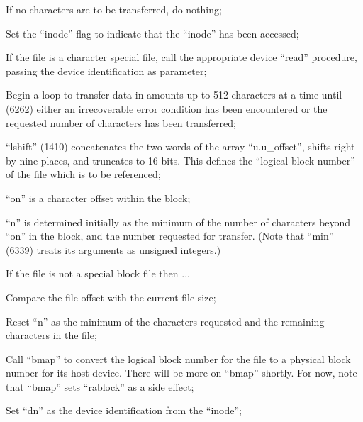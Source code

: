 
\bd
\item[6230:] If no characters are to be
transferred, do nothing;

\item[6232:] Set the ``inode'' flag to indicate
that the ``inode'' has been accessed;

\item[6233:] If the file is a character special file, call the appropriate
 device ``read'' procedure, passing
 the device identification as
 parameter;

\item[6238:] Begin a loop to transfer data in
 amounts up to 512 characters at a
 time until (6262) either an irrecoverable error condition has
 been encountered or the requested
 number of characters has been
 transferred;

\item[6239:] ``lshift'' (1410) concatenates the
 two words of the array
 ``u.u\_offset'', shifts right by
 nine places, and truncates to 16
 bits. This defines the ``logical
block number'' of the file which
is to be referenced;

\item[6240:] ``on'' is a character offset within
 the block;

\item[6241:] ``n'' is determined initially as
the minimum of the number of
characters beyond ``on'' in the
block, and the number requested
for transfer. (Note that ``min''
(6339) treats its arguments as
unsigned integers.)

\item[6242:] If the file is not a special
 block file then ...

\item[6243:] Compare the file offset with the
 current file size;

\item[6246:] Reset ``n'' as the minimum of the
 characters requested and the
 remaining characters in the file;

\item[6248:] Call ``bmap'' to convert the logical block number for the file to
 a physical block number for its
 host device. There will be more
 on ``bmap'' shortly. For now, note
 that ``bmap'' sets ``rablock'' as a
 side effect;

\item[6250:] Set ``dn'' as the device identification from the ``inode'';

